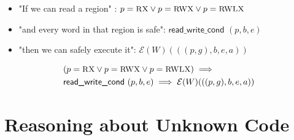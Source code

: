 \documentclass{beamer}
\newcommand{\interp}[2]{(#1)(#2)}
\begin{document}
\begin{frame}
\begin{itemize}
	\item<2-> "If we can read a region" : $p = \textsc{\small RX} \vee p = \textsc{\small RWX} \vee p = \textsc{\small RWLX}$
	\item<3-> "and every word in that region is safe": $\textsf{read\_write\_cond }(p,b,e)$
	\item<4-> "then we can safely execute it": $\mathcal{E}\interp{W}{((p,g),b,e,a)}$
\end{itemize}

\begin{align*}
	&(p = \textsc{\small RX} \vee p = \textsc{\small RWX} \vee p = \textsc{\small RWLX}) \implies\\
	&\textsf{read\_write\_cond }(p,b,e) \implies \mathcal{E}\interp{W}{((p,g),b,e,a)}
\end{align*}
\end{frame}

\section{Reasoning about Unknown Code}
\end{document}
